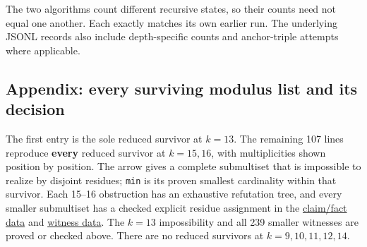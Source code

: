 \documentclass[11pt,a4paper]{article}
\begin{document}
The two algorithms count different recursive states, so their counts need not equal one another. Each exactly matches its own earlier run. The underlying JSONL records also include depth-specific counts and anchor-triple attempts where applicable.

\subsection{Appendix: every surviving modulus list and its decision}\label{appendix-every-surviving-modulus-list-and-its-decision}

The first entry is the sole reduced survivor at \(k=13\). The remaining 107 lines reproduce \textbf{every} reduced survivor at \(k=15,16\), with multiplicities shown position by position. The arrow gives a complete submultiset that is impossible to realize by disjoint residues; \texttt{min} is its proven smallest cardinality within that survivor. Each 15--16 obstruction has an exhaustive refutation tree, and every smaller submultiset has a checked explicit residue assignment in the \href{https://github.com/mpelteshki/climbing-to-the-frontier/blob/212bba53b1818c08c40b8c4b48f636651eaf6410/cagent/p4/audit/global-minima-claims.jsonl}{claim/fact data} and \href{https://github.com/mpelteshki/climbing-to-the-frontier/blob/212bba53b1818c08c40b8c4b48f636651eaf6410/cagent/p4/audit/global-minima-facts.jsonl}{witness data}. The \(k=13\) impossibility and all 239 smaller witnesses are proved or checked above. There are no reduced survivors at \(k=9,10,11,12,14\).
\end{document}
